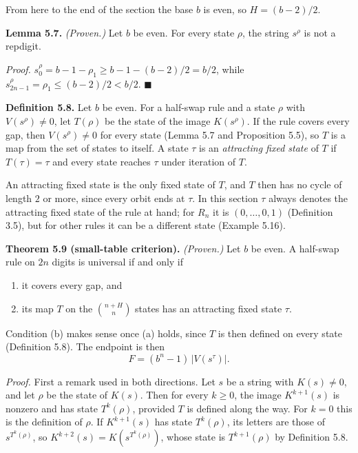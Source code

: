 \documentclass[11pt,letterpaper]{article}
\theoremstyle{paperstyle}
\theoremstyle{paperstyledef}
\theoremstyle{paperstylerem}
\begin{document}
From here to the end of the section the base \(b\) is even, so \(H = (b-2)/2\).

\textbf{Lemma 5.7.} \emph{(Proven.)} Let \(b\) be even. For every state \(\rho\), the string \(s^\rho\) is not a repdigit.

\emph{Proof.} \(s^\rho_0 = b - 1 - \rho_1 \ge b - 1 - (b-2)/2 = b/2\), while \(s^\rho_{2n-1} = \rho_1 \le (b-2)/2 < b/2\). \(\blacksquare\)

\textbf{Definition 5.8.} Let \(b\) be even. For a half-swap rule and a state \(\rho\) with \(V(s^\rho) \ne 0\), let \(T(\rho)\) be the state of the image \(K(s^\rho)\). If the rule covers every gap, then \(V(s^\rho) \ne 0\) for every state (Lemma 5.7 and Proposition 5.5), so \(T\) is a map from the set of states to itself. A state \(\tau\) is an \emph{attracting fixed state} of \(T\) if \(T(\tau) = \tau\) and every state reaches \(\tau\) under iteration of \(T\).

An attracting fixed state is the only fixed state of \(T\), and \(T\) then has no cycle of length \(2\) or more, since every orbit ends at \(\tau\). In this section \(\tau\) always denotes the attracting fixed state of the rule at hand; for \(R_n\) it is \((0, \dots, 0, 1)\) (Definition 3.5), but for other rules it can be a different state (Example 5.16).

\textbf{Theorem 5.9 (small-table criterion).} \emph{(Proven.)} Let \(b\) be even. A half-swap rule on \(2n\) digits is universal if and only if

\begin{enumerate}
\def\labelenumi{(\alph{enumi})}
\item
  it covers every gap, and
\item
  its map \(T\) on the \(\binom{n+H}{n}\) states has an attracting fixed state \(\tau\).
\end{enumerate}

Condition (b) makes sense once (a) holds, since \(T\) is then defined on every state (Definition 5.8). The endpoint is then \[F = (b^n - 1)\,|V(s^\tau)|.\]

\emph{Proof.} First a remark used in both directions. Let \(s\) be a string with \(K(s) \ne 0\), and let \(\rho\) be the state of \(K(s)\). Then for every \(k \ge 0\), the image \(K^{k+1}(s)\) is nonzero and has state \(T^k(\rho)\), provided \(T\) is defined along the way. For \(k = 0\) this is the definition of \(\rho\). If \(K^{k+1}(s)\) has state \(T^k(\rho)\), its letters are those of \(s^{T^k(\rho)}\), so \(K^{k+2}(s) = K(s^{T^k(\rho)})\), whose state is \(T^{k+1}(\rho)\) by Definition 5.8.
\end{document}
